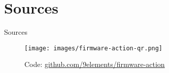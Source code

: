 \documentclass{beamer}
\begin{document}

\section{Sources}
\begin{frame}{Sources}
	\begin{figure}
	\centering
	\texttt{[image: images/firmware-action-qr.png]}
	\caption{Code: \url{github.com/9elements/firmware-action}}
	\label{fig:link-firmware-action}
	\end{figure}
\end{frame}


\end{document}
